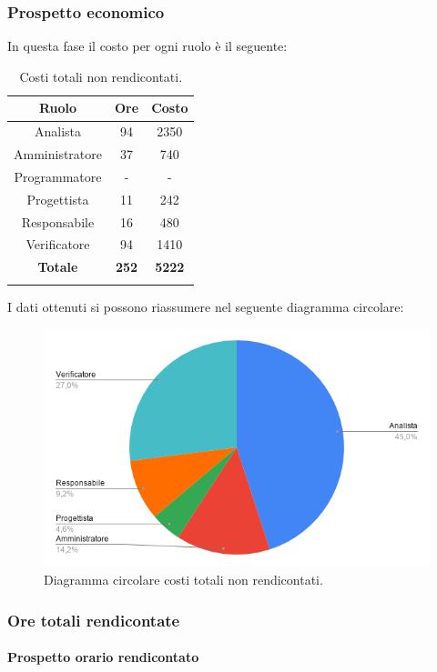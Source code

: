 \subsubsection{Prospetto economico}

In questa fase il costo per ogni ruolo è il seguente:
\begin{longtable}{|c|c|c|}
	\hline
	\rowcolor[HTML]{F9CB9C} 
	\textbf{Ruolo} & \textbf{Ore} & \textbf{Costo} \\
	\hline
	Analista &
	94 &
	2350 \\
	\hline
	Amministratore &
	37 &
	740 \\
	\hline
	Programmatore &
	- &
	- \\
	\hline
	Progettista &
	11 &
	242 \\
	\hline
	Responsabile &
	16 &
	480 \\
	\hline
	Verificatore &
	94 &
	1410 \\
	\hline
	\rowcolor[HTML]{F9CB9C} 
	\textbf{Totale} & \textbf{252} & \textbf{5222} \\
	\hline
	\caption{Costi totali non rendicontati.}
	\label{fig: Costi totali non rendicontati.}
\end{longtable}

I dati ottenuti si possono riassumere nel seguente diagramma circolare:
\begin{figure}[H]
	\centering
	\includegraphics[width=0.6\linewidth]{./res/images/CostiNonRendicontati.png}
	\caption{Diagramma circolare costi totali non rendicontati.}
	\label{fig: Diagramma circolare costi totali non rendicontati.}
\end{figure}

\subsubsection{Ore totali rendicontate}

\paragraph{Prospetto orario rendicontato}

